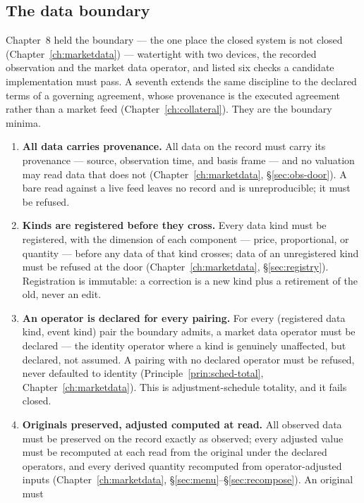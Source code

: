 \documentclass[11pt,a4paper]{article}
\begin{document}
\subsection{The data boundary}

Chapter~8 held the boundary --- the one place the closed system is not closed
(Chapter~\ref{ch:marketdata}) --- watertight with two devices, the recorded observation and the
market data operator, and listed six checks a candidate implementation must pass. A seventh
extends the same discipline to the declared terms of a
governing agreement, whose provenance is the executed agreement rather than a market feed
(Chapter~\ref{ch:collateral}). They are the boundary minima.

\begin{enumerate}[label=\textbf{B\arabic*.}, ref=B\arabic*, leftmargin=*, itemsep=3pt]
\item \textbf{All data carries provenance.} All data on the record must carry its
  provenance --- source, observation time, and basis frame --- and no valuation may read
  data that does not (Chapter~\ref{ch:marketdata}, \S\ref{sec:obs-door}). A bare read
  against a live feed leaves no record and is unreproducible; it must be refused.
\item \textbf{Kinds are registered before they cross.} Every data kind must be
  registered, with the dimension of each component --- price, proportional, or quantity ---
  before any data of that kind crosses; data of an unregistered kind must be refused at
  the door (Chapter~\ref{ch:marketdata}, \S\ref{sec:registry}). Registration is immutable:
  a correction is a new kind plus a retirement of the old, never an edit.
\item \textbf{An operator is declared for every pairing.} For every (registered data kind,
  event kind) pair the boundary admits, a market data operator must be declared --- the
  identity operator where a kind is genuinely unaffected, but declared, not assumed. A
  pairing with no declared operator must be refused, never defaulted to identity
  (Principle~\ref{prin:sched-total}, Chapter~\ref{ch:marketdata}). This is
  adjustment-schedule totality, and it fails closed.
\item \textbf{Originals preserved, adjusted computed at read.} All observed data must be
  preserved on the record exactly as observed; every adjusted value must be recomputed at
  each read from the original under the declared operators, and every derived quantity
  recomputed from operator-adjusted inputs
  (Chapter~\ref{ch:marketdata}, \S\ref{sec:menu}--\S\ref{sec:recompose}). An original must

\end{enumerate}
\end{document}

